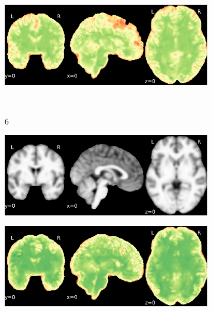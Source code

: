 \documentclass{article}
\begin{document}
\begin{appendices}
\begin{landscape}
\begin{figure}
\begin{subfigure}[t]{0.2\paperheight}
            \end{subfigure}
            \begin{subfigure}[t]{0.2\paperheight}
                \centering
                \includegraphics[width=\textwidth]{figures/sig/5mm/rr.rs_ds001748_sub-adult15_sig.pdf}
            \end{subfigure} \\
            \begin{subfigure}[b][][c]{0.01\paperwidth} 6 \vspace*{15pt} \end{subfigure}
            \begin{subfigure}[t]{0.2\paperheight}
                \centering
                \includegraphics[width=\textwidth]{figures/sig/5mm/ieee_ds001748_sub-adult16.pdf}
            \end{subfigure}
            \begin{subfigure}[t]{0.2\paperheight}
                \centering
                \includegraphics[width=\textwidth]{figures/sig/5mm/rr_ds001748_sub-adult16_sig.pdf}

\end{subfigure}
\end{figure}
\end{landscape}
\end{appendices}
\end{document}
